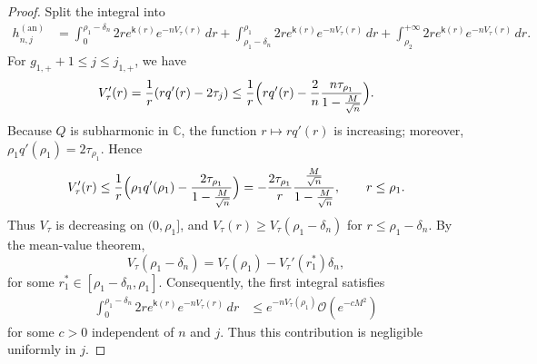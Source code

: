 \documentclass[a4paper]{article}
\numberwithin{equation}{section}
\begin{document}
\begin{proof}
Split the integral into
\begin{align*}
h_{n,j}^{(\mathrm{an})}
&=\int_{0}^{\rho_1-\delta_n}2re^{\mathsf{k}(r)}e^{-nV_{\tau}(r)}\,dr
+\int_{\rho_1-\delta_n}^{\rho_1}2re^{\mathsf{k}(r)}e^{-nV_{\tau}(r)}\,dr
+\int_{\rho_2}^{+\infty}2re^{\mathsf{k}(r)}e^{-nV_{\tau}(r)}\,dr. 
\end{align*}
For $g_{1,+}+1\leq j\leq j_{1,+}$, we have
\[
V_{\tau}'(r)=\frac{1}{r}(rq'(r)-2\tau_j)\leq \frac{1}{r}\Bigl(rq'(r)-\frac{2}{n}\frac{n\tau_{\rho_1}}{1-\frac{M}{\sqrt{n}}}\Bigr).
\]
Because $Q$ is subharmonic in $\mathbb C$, the function $r\mapsto rq'(r)$ is increasing; moreover, $\rho_1q'(\rho_1)=2\tau_{\rho_1}$. Hence
\begin{equation}
\label{def of Vtau r leq rho1ast}
V_{\tau}'(r)
\leq \frac{1}{r}\Bigl(\rho_1q'(\rho_1)-\frac{2\tau_{\rho_1}}{1-\frac{M}{\sqrt n}}\Bigr)
=-\frac{2\tau_{\rho_1}}{r}\frac{\frac{M}{\sqrt n}}{1-\frac{M}{\sqrt n}},
\qquad r\leq \rho_1.
\end{equation}
Thus $V_\tau$ is decreasing on $(0,\rho_1]$, and $V_\tau(r)\geq V_\tau(\rho_1-\delta_n)$ for $r\leq\rho_1-\delta_n$. By the mean-value theorem,
\begin{equation}
    V_{\tau}(\rho_1-\delta_n)=V_{\tau}(\rho_1)-V_{\tau}'(r_1^{\ast})\delta_n,
\end{equation}
for some $r_{1}^{\ast}\in[\rho_1-\delta_n,\rho_1]$. 
Consequently, the first integral satisfies
\begin{align*}
\int_{0}^{\rho_1-\delta_n}2re^{\mathsf{k}(r)}e^{-nV_{\tau}(r)}\,dr
&\leq e^{-nV_{\tau}(\rho_1)}\mathcal O(e^{-cM^2})
\end{align*}
for some $c>0$ independent of $n$ and $j$. Thus this contribution is negligible uniformly in $j$.
 

\end{proof}
\end{document}
